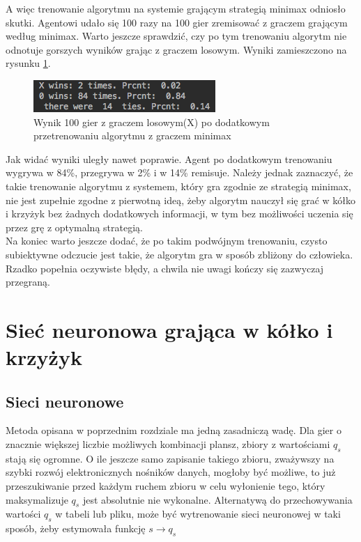 \documentclass[licencjacka]{pracamgr}
\begin{document}
A więc trenowanie algorytmu na systemie grającym strategią minimax odniosło skutki.  Agentowi udało się 100 razy na 100 gier zremisować z graczem grającym według minimax. Warto jeszcze sprawdzić, czy po tym trenowaniu algorytm nie odnotuje gorszych wyników grając z graczem losowym. Wyniki zamieszczono na rysunku \ref{Rys19}.\\

\begin{figure}[h!]
	\includegraphics [scale=0.8]{QTable_vs_Rnd_trained_d.png}
	\caption{Wynik 100 gier z graczem losowym(X) po dodatkowym przetrenowaniu algorytmu z graczem minimax}
	\label{Rys19}
\end{figure}

Jak widać wyniki uległy nawet poprawie. Agent po dodatkowym trenowaniu wygrywa w 84\%, przegrywa w 2\% i w 14\% remisuje. Należy jednak zaznaczyć, że takie trenowanie algorytmu z systemem, który gra zgodnie ze strategią minimax, nie jest zupełnie zgodne z pierwotną ideą, żeby algorytm nauczył się grać w kółko i krzyżyk bez żadnych dodatkowych informacji, w tym bez możliwości uczenia się przez grę z optymalną strategią. \\

Na koniec warto jeszcze dodać, że po takim podwójnym trenowaniu, czysto subiektywne odczucie jest takie, że algorytm gra w sposób zbliżony do człowieka. Rzadko popełnia oczywiste błędy, a chwila nie uwagi kończy się zazwyczaj przegraną. 

 
\chapter{Sieć neuronowa grająca w kółko i krzyżyk }\label{r:Siec}

\section{Sieci neuronowe}
Metoda opisana w poprzednim rozdziale ma jedną zasadniczą wadę. Dla gier o znacznie większej liczbie możliwych kombinacji plansz, zbiory z wartościami $q_{s}$ stają się ogromne. O ile jeszcze samo zapisanie takiego zbioru, zważywszy na szybki rozwój elektronicznych nośników danych, mogłoby być możliwe, to już przeszukiwanie przed każdym ruchem zbioru w celu wyłonienie tego, który maksymalizuje $q_{s}$ jest absolutnie nie wykonalne. Alternatywą do przechowywania wartości $q_{s}$ w tabeli lub pliku, może być wytrenowanie sieci neuronowej w taki sposób, żeby estymowała funkcję $s\rightarrow q_{s}$\\
\end{document}
